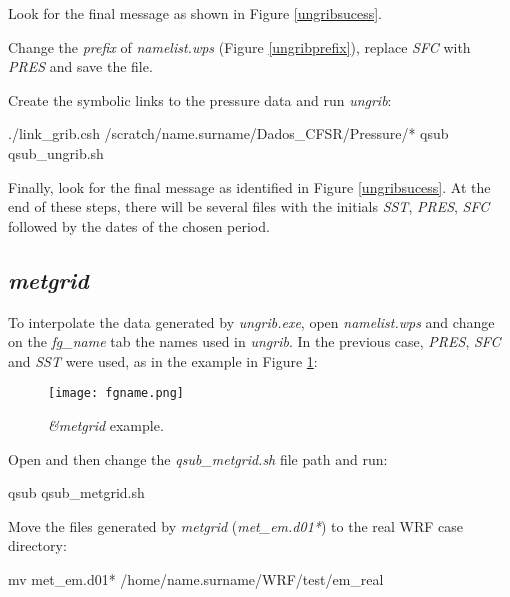 \noindent Look for the final message as shown in Figure \textcolor{bleu_cite}{\ref{ungribsucess}}.
\bigskip

\noindent Change the \textit{prefix} of \textit{namelist.wps} (Figure \textcolor{bleu_cite}{\ref{ungribprefix}}), replace \textit {SFC} with \textit{PRES} and save the file.
\bigskip

\noindent Create the symbolic links to the pressure data and run \textit{ungrib}:
\bigskip

\begin{bashcode}
./link_grib.csh /scratch/name.surname/Dados_CFSR/Pressure/*
qsub qsub_ungrib.sh
\end{bashcode}
\bigskip

\noindent Finally, look for the final message as identified in Figure \textcolor{bleu_cite}{\ref{ungribsucess}}. 
At the end of these steps, there will be several files with the initials \textit {SST}, \textit {PRES}, \textit {SFC} followed by the
dates of the chosen period.
\bigskip


\subsection{\textit{metgrid}}\label{metgridsecao}
\bigskip
\noindent To interpolate the data generated by \textit{ungrib.exe}, open \textit{namelist.wps} and change on the \textit{fg\_name} tab the 
names used in \textit {ungrib}. In the previous case, \textit {PRES}, \textit{SFC} and \textit{SST} were used, as in the example in 
Figure \textcolor{bleu_cite}{\ref{fgname}}:
\bigskip

\begin{figure}[H]
    \centering
    \texttt{[image: fgname.png]}
    \caption{\textit{\&metgrid} example.}
    \label{fgname}
\end{figure}
\bigskip

\noindent Open and then change the \textit{qsub\_metgrid.sh} file path and run:
\bigskip

\begin{bashcode}
qsub qsub_metgrid.sh
\end{bashcode}
\bigskip

\noindent Move the files generated by \textit{metgrid} (\textit {met\_em.d01*}) to the real WRF case directory:
\bigskip

\begin{bashcode}
 mv met_em.d01* /home/name.surname/WRF/test/em_real
\end{bashcode}
\bigskip


